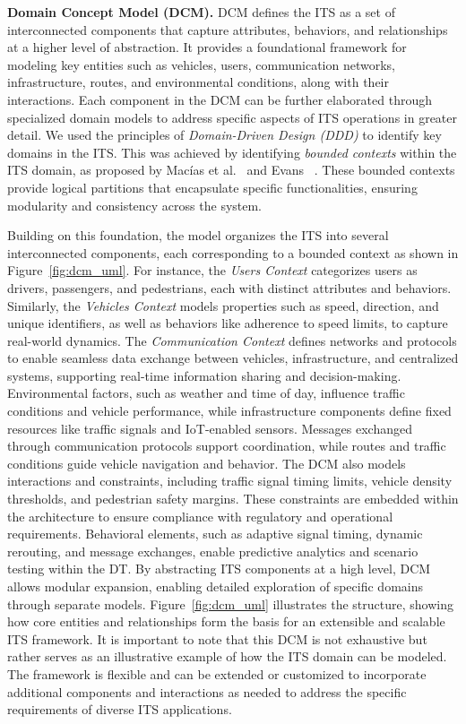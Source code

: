 \textbf{Domain Concept Model (DCM).} DCM defines the ITS as a set of interconnected components that capture attributes, behaviors, and relationships at a higher level of abstraction. It provides a foundational framework for modeling key entities such as vehicles, users, communication networks, infrastructure, routes, and environmental conditions, along with their interactions. Each component in the DCM can be further elaborated through specialized domain models to address specific aspects of ITS operations in greater detail. We used the principles of \textit{Domain-Driven Design (DDD)} to identify key domains in the ITS. This was achieved by identifying \textit{bounded contexts} within the ITS domain, as proposed by Macías et al.~\cite{macias2023architecting} and Evans ~\cite{evans2004domain}. These bounded contexts provide logical partitions that encapsulate specific functionalities, ensuring modularity and consistency across the system.  


Building on this foundation, the model organizes the ITS into several interconnected components, each corresponding to a bounded context as shown in Figure~\ref{fig:dcm_uml}. For instance, the \textit{Users Context} categorizes users as drivers, passengers, and pedestrians, each with distinct attributes and behaviors. Similarly, the \textit{Vehicles Context} models properties such as speed, direction, and unique identifiers, as well as behaviors like adherence to speed limits, to capture real-world dynamics. The \textit{Communication Context} defines networks and protocols to enable seamless data exchange between vehicles, infrastructure, and centralized systems, supporting real-time information sharing and decision-making. Environmental factors, such as weather and time of day, influence traffic conditions and vehicle performance, while infrastructure components define fixed resources like traffic signals and IoT-enabled sensors. Messages exchanged through communication protocols support coordination, while routes and traffic conditions guide vehicle navigation and behavior. The DCM also models interactions and constraints, including traffic signal timing limits, vehicle density thresholds, and pedestrian safety margins. These constraints are embedded within the architecture to ensure compliance with regulatory and operational requirements. Behavioral elements, such as adaptive signal timing, dynamic rerouting, and message exchanges, enable predictive analytics and scenario testing within the DT. By abstracting ITS components at a high level, DCM allows modular expansion, enabling detailed exploration of specific domains through separate models. Figure~\ref{fig:dcm_uml} illustrates the structure, showing how core entities and relationships form the basis for an extensible and scalable ITS framework. It is important to note that this DCM is not exhaustive but rather serves as an illustrative example of how the ITS domain can be modeled. The framework is flexible and can be extended or customized to incorporate additional components and interactions as needed to address the specific requirements of diverse ITS applications. 





